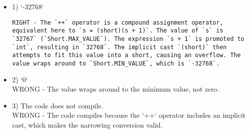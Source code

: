 \documentclass[12pt]{article}
\begin{document}
\begin{enumerate}[label=(\arabic*)]
\begin{itemize}
\item 1) `-32768`
 \\ 
\begin{verbatim}RIGHT - The `++` operator is a compound assignment operator, equivalent here to `s = (short)(s + 1)`. The value of `s` is `32767` (`Short.MAX_VALUE`). The expression `s + 1` is promoted to `int`, resulting in `32768`. The implicit cast `(short)` then attempts to fit this value into a short, causing an overflow. The value wraps around to `Short.MIN_VALUE`, which is `-32768`.\end{verbatim}

\item 2) `0`
 \\ 
WRONG - The value wraps around to the minimum value, not zero.

\item 3) The code does not compile.
 \\ 
WRONG - The code compiles because the `++` operator includes an implicit cast, which makes the narrowing conversion valid.

\end{itemize}

\end{enumerate}
\end{document}
